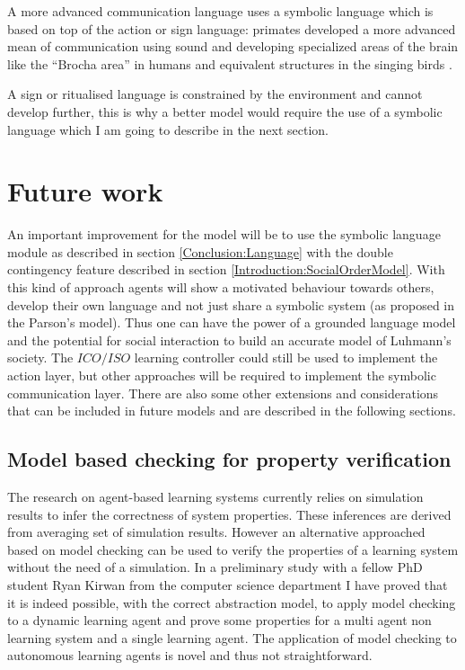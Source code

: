 A more advanced communication language uses a symbolic language which is based
on top of the action or sign language:
primates developed a more advanced mean of communication using sound and developing
 specialized areas of the brain like the ``Brocha area'' in humans and equivalent
structures in the singing birds \citep{FoxP2Gene:Nature:2001,FOXP2Identification:2005}.

A sign or ritualised language is constrained by the environment and cannot develop further, 
this is why a better model would require the use of a symbolic language which I am
going to describe in the next section.



\section{Future work \label{Conclusion:FutureWork}}

An important improvement for the model will be to use the symbolic language
module as described in section \ref{Conclusion:Language} with the double contingency
feature described in section \ref{Introduction:SocialOrderModel}.
With this kind of approach agents will show a motivated behaviour towards others, 
develop their own language and not just share a symbolic system (as proposed in the Parson's model).
Thus one can have the power of a grounded language model and the
potential for social interaction to build an accurate model of Luhmann's society.
The $ICO/ISO$ learning controller could still be used to implement the action layer,
but other approaches will be required to implement the symbolic communication layer.
There are also some other extensions and considerations that can be included in future
models and are described in the following sections.


\subsection{Model based checking for property verification \label{Conclusion:ModelCheck}}

The research on agent-based learning systems
currently relies on simulation results to infer the correctness of system properties.
These inferences are derived from averaging set of simulation results. 
However an alternative approached based on model checking can be used
to verify the properties of a learning system without the need of a simulation.
In a preliminary study with a fellow PhD student Ryan Kirwan from the computer
science department I have proved that it is indeed possible, with the correct
 abstraction model, to apply model checking to a dynamic learning agent and 
 prove some properties for a multi agent non learning system and a single
 learning agent.
The application of model checking to autonomous learning agents is novel
  and thus not straightforward.
  
